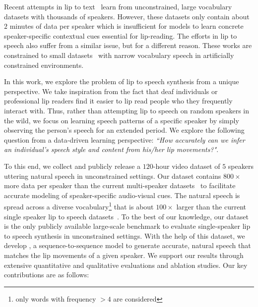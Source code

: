 \documentclass[10pt,twocolumn,letterpaper]{article}
\begin{document}
Recent attempts in lip to text~\cite{Afouras2018DeepLR,chung2017lip} learn from unconstrained, large vocabulary datasets with thousands of speakers. However, these datasets only contain about $2$ minutes of data per speaker which is insufficient for models to learn concrete speaker-specific contextual cues essential for lip-reading. The efforts in lip to speech also suffer from a similar issue, but for a different reason. These works are constrained to small datasets~\cite{cooke2006audio} with narrow vocabulary speech in artificially constrained environments. 

In this work, we explore the problem of lip to speech synthesis from a unique perspective. We take inspiration from the fact that deaf individuals or professional lip readers find it easier to lip read people who they frequently interact with. Thus, rather than attempting lip to speech on random speakers in the wild, we focus on learning speech patterns of a specific speaker by simply observing the person's speech for an extended period. We explore the following question from a data-driven learning perspective: \textit{``How accurately can we infer an individual’s speech style and content from his/her lip movements?"}.

To this end, we collect and publicly release a $120$-hour video dataset of $5$ speakers uttering natural speech in unconstrained settings. Our \modelname dataset contains $800\times$ more data per speaker than the current multi-speaker datasets~\cite{Afouras2018DeepLR} to facilitate accurate modeling of speaker-specific audio-visual cues. The natural speech is spread across a diverse vocabulary\footnote{only words with frequency $> 4$ are considered} that is about $100\times$ larger than the current single speaker lip to speech datasets~\cite{cooke2006audio,harte2015tcd}. To the best of our knowledge, our dataset is the only publicly available large-scale benchmark to evaluate single-speaker lip to speech synthesis in unconstrained settings. With the help of this dataset, we develop \modelnamewithoutspace, a sequence-to-sequence model to generate accurate, natural speech that matches the lip movements of a given speaker. We support our results through extensive quantitative and qualitative evaluations and ablation studies. Our key contributions are as follows:
\end{document}
